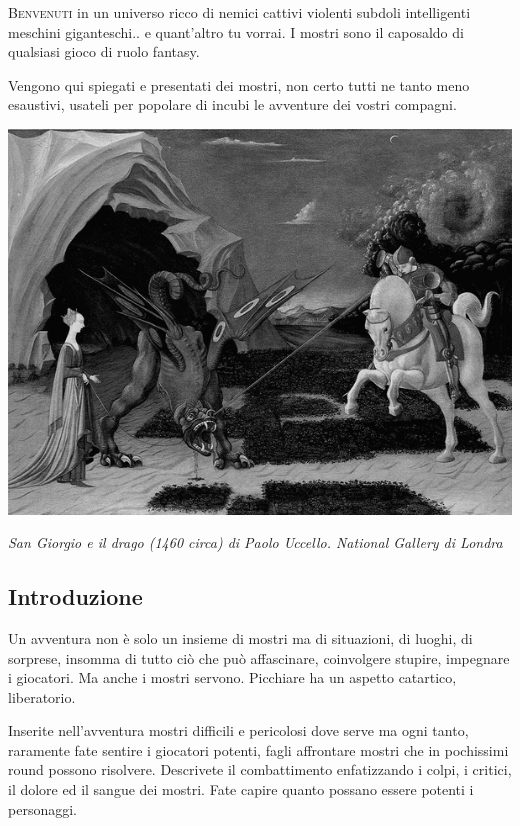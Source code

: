 \begin{multicols}{2}

\lettrine[lines=2, lhang=0.33, loversize=0.25, findent=1.5em]{B}{envenuti} in un universo ricco di nemici cattivi violenti subdoli intelligenti meschini giganteschi.. e quant'altro tu vorrai. I mostri sono il caposaldo di qualsiasi gioco di ruolo fantasy.

Vengono qui spiegati e presentati dei mostri, non certo tutti ne tanto meno esaustivi, usateli per popolare di incubi le avventure dei vostri compagni.

\medskip

\begin{center}

\includegraphics[width=0.8\linewidth]{immagini/sangiorgioedrago.png}

\textit{San Giorgio e il drago (1460 circa) di Paolo Uccello. National Gallery di Londra}
\end{center}

\subsection{Introduzione}

Un avventura non è solo un insieme di mostri ma di situazioni, di luoghi, di sorprese, insomma di tutto ciò che può affascinare, coinvolgere stupire, impegnare i giocatori. Ma anche i mostri servono. Picchiare ha un aspetto catartico, liberatorio.

Inserite nell'avventura mostri difficili e pericolosi dove serve ma ogni tanto, raramente fate sentire i giocatori potenti, fagli affrontare mostri che in pochissimi round possono risolvere. Descrivete il combattimento enfatizzando i colpi, i critici, il dolore ed il sangue dei mostri. Fate capire quanto possano essere potenti i personaggi.


\end{multicols}
